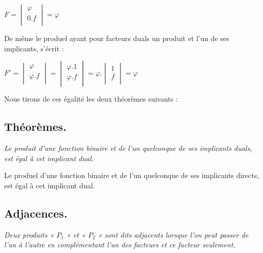\begin{itemize}
\centerline{
$F = \begin{vmatrix} \varphi \\ 0 . f \\ \end{vmatrix} = \varphi $ 
}

De même le produel ayant pour facteurs duals un produit et l'un de ses implicants, s'écrit : 

\centerline  {
$ F' = \begin{vmatrix} \varphi \\  \varphi . f \\ \end{vmatrix} = \begin{vmatrix} \varphi .1 \\ \varphi  . f \\ \end{vmatrix} = \varphi . \begin{vmatrix} 1  \\  f \\ \end{vmatrix} = \varphi $   
} 

\end{itemize}

Nous tirons de ces égalité les deux théorèmes suivants : 

\subsection{Théorèmes. } \textsl{
Le produit d'une fonction binaire et de l'un quelconque de ses implicants duals, est égal à cet implicant dual. } 

\centerline{  } 

Le produel d'une fonction binaire et de l'un quelconque de ses implicants directs, est égal à cet implicant dual.  

\centerline{  } 

\subsection{Adjacences. } \textsl{ Deux produits « $P_1$ » et « $P_2$ » sont dits adjacents lorsque l'on peut passer de l'un à l'autre en complémentant l'un des facteurs et ce facteur seulement. }

